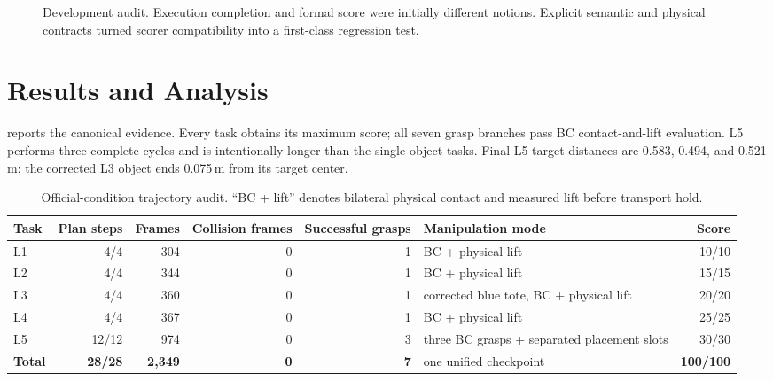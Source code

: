 \documentclass[10pt,twocolumn]{article}
\begin{document}
\begin{figure}[t]
\centering
{}
\caption{Development audit. Execution completion and formal score were initially different notions. Explicit semantic and physical contracts turned scorer compatibility into a first-class regression test.}
\label{fig:timeline}
\end{figure}

\section{Results and Analysis}

 reports the canonical evidence. Every task obtains its maximum score; all seven grasp branches pass BC contact-and-lift evaluation. L5 performs three complete cycles and is intentionally longer than the single-object tasks. Final L5 target distances are 0.583, 0.494, and 0.521\,m; the corrected L3 object ends 0.075\,m from its target center.

\begin{table}[t]
\centering
\caption{Official-condition trajectory audit. ``BC + lift'' denotes bilateral physical contact and measured lift before transport hold.}
\label{tab:results}
\small
\begin{tabularx}{0.94\textwidth}{lrrrrXr}
\toprule
Task & Plan steps & Frames & Collision frames & Successful grasps & Manipulation mode & Score \\
\midrule
L1 & 4/4 & 304 & 0 & 1 & BC + physical lift & 10/10 \\
L2 & 4/4 & 344 & 0 & 1 & BC + physical lift & 15/15 \\
L3 & 4/4 & 360 & 0 & 1 & corrected blue tote, BC + physical lift & 20/20 \\
L4 & 4/4 & 367 & 0 & 1 & BC + physical lift & 25/25 \\
L5 & 12/12 & 974 & 0 & 3 & three BC grasps + separated placement slots & 30/30 \\
\midrule
\textbf{Total} & \textbf{28/28} & \textbf{2,349} & \textbf{0} & \textbf{7} & one unified checkpoint & \textbf{100/100} \\
\bottomrule
\end{tabularx}
\end{table}
\end{document}
